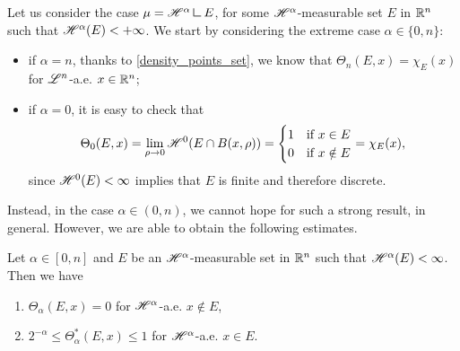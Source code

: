 Let us consider the case $\mu = \Haus{\alpha} \res E$, for some $\mathscr{H}^{\alpha}$-measurable set $E$ in $\mathbb{R}^{n}$ such that $\mathscr{H}^{\alpha}(E) < + \infty$. We start by considering the extreme case $\alpha \in \{0, n\}$:
\begin{itemize}
\item if $\alpha = n$, thanks to \eqref{density_points_set}, we know that $\Theta_{n}(E, x) = \chi_{E}(x)$ for $\mathscr{L}^{n}$-a.e. $x \in \mathbb{R}^{n}$; 
\item if $\alpha = 0$, it is easy to check that
\begin{equation*}
\Theta_{0}(E, x) = \lim_{\rho \to 0} \mathscr{H}^{0}(E \cap B(x, \rho)) = \begin{cases} 1 & \text{if} \ x \in E \\
0 & \text{if} \ x \notin E
\end{cases} = \chi_{E}(x),
\end{equation*} 
since $\mathscr{H}^{0}(E) < \infty$ implies that $E$ is finite and therefore discrete.
\end{itemize}
Instead, in the case $\alpha \in (0, n)$, we cannot hope for such a strong result, in general. However, we are able to obtain the following estimates.

\begin{proposition}
Let $\alpha \in [0, n]$ and $E$ be an $\mathscr{H}^{\alpha}$-measurable set in $\mathbb{R}^{n}$ such that $\mathscr{H}^{\alpha}(E) < \infty$. Then we have
\begin{enumerate}
\item $\Theta_{\alpha}(E, x) = 0$ for $\mathscr{H}^{\alpha}$-a.e. $x \notin E$,
\item $2^{-\alpha} \le \Theta^{*}_{\alpha}(E, x) \le 1$ for $\mathscr{H}^{\alpha}$-a.e. $x \in E$.
\end{enumerate}
\end{proposition}
%

